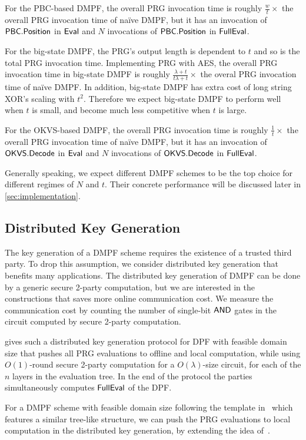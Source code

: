 For the PBC-based DMPF, the overall PRG invocation time is roughly $\frac{w}{t}\times $ the overall PRG invocation time of na\"ive DMPF, but it has an invocation of $\sf PBC.Position$ in ${\sf Eval}$ and $N$ invocations of $\sf PBC.Position$ in ${\sf FullEval}$. 

For the big-state DMPF, the PRG's output length is dependent to $t$ and so is the total PRG invocation time. Implementing PRG with AES, the overall PRG invocation time in big-state DMPF is roughly $\frac{\lambda+t}{t\lambda+t}\times $ the overal PRG invocation time of na\"ive DMPF. In addition, big-state DMPF has extra cost of long string XOR's scaling with $t^2$. Therefore we expect big-state DMPF to perform well when $t$ is small, and become much less competitive when $t$ is large.

For the OKVS-based DMPF, the overall PRG invocation time is roughly $\frac{1}{t}\times $ the overall PRG invocation time of na\"ive DMPF, but it has an invocation of $\sf OKVS.Decode$ in ${\sf Eval}$ and $N$ invocations of $\sf OKVS.Decode$ in ${\sf FullEval}$. 

Generally speaking, we expect different DMPF schemes to be the top choice for different regimes of $N$ and $t$. Their concrete performance will be discussed later in \cref{sec:implementation}. 

\subsection{Distributed Key Generation}
The key generation of a DMPF scheme requires the existence of a trusted third party. To drop this assumption, we consider distributed key generation that benefits many applications. The distributed key generation of DMPF can be done by a generic secure 2-party computation, but we are interested in the constructions that saves more online communication cost. We measure the communication cost by counting the number of single-bit ${\sf AND}$ gates in the circuit computed by secure 2-party computation. 

\cite{cryptoeprint:2017/827} gives such a distributed key generation protocol for DPF with feasible domain size that pushes all PRG evaluations to offline and local computation, while using $O(1)$-round secure 2-party computation for a $O(\lambda)$-size circuit, for each of the $n$ layers in the evaluation tree. In the end of the protocol the parties simultaneously computes ${\sf FullEval}$ of the DPF. 

For a DMPF scheme with feasible domain size following the template in~ which features a similar tree-like structure, we can push the PRG evaluations to local computation in the distributed key generation, by extending the idea of~\cite{cryptoeprint:2017/827}. 

